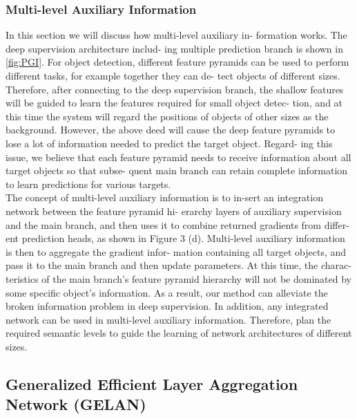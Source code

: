         \subsubsection{Multi-level Auxiliary Information}
            In this section we will discuss how multi-level auxiliary in-
            formation works. The deep supervision architecture includ-
            ing multiple prediction branch is shown in \ref{fig:PGI}. For
            object detection, different feature pyramids can be used to
            perform different tasks, for example together they can de-
            tect objects of different sizes. Therefore, after connecting
            to the deep supervision branch, the shallow features will be
            guided to learn the features required for small object detec-
            tion, and at this time the system will regard the positions
            of objects of other sizes as the background. However, the
            above deed will cause the deep feature pyramids to lose a lot
            of information needed to predict the target object. Regard-
            ing this issue, we believe that each feature pyramid needs
            to receive information about all target objects so that subse-
            quent main branch can retain complete information to learn
            predictions for various targets.\\
            \vspace{3mm}
            The concept of multi-level auxiliary information is to in-sert
            an integration network between the feature pyramid hi-
            erarchy layers of auxiliary supervision and the main branch,
            and then uses it to combine returned gradients from differ-
            ent prediction heads, as shown in Figure 3 (d). Multi-level
            auxiliary information is then to aggregate the gradient infor-
            mation containing all target objects, and pass it to the main
            branch and then update parameters. At this time, the charac-
            teristics of the main branch’s feature pyramid hierarchy will
            not be dominated by some specific object’s information. As
            a result, our method can alleviate the broken information
            problem in deep supervision. In addition, any integrated
            network can be used in multi-level auxiliary information.
            Therefore, plan the required semantic levels to guide
            the learning of network architectures of different sizes.
    \subsection{Generalized Efficient Layer Aggregation Network (GELAN)}
